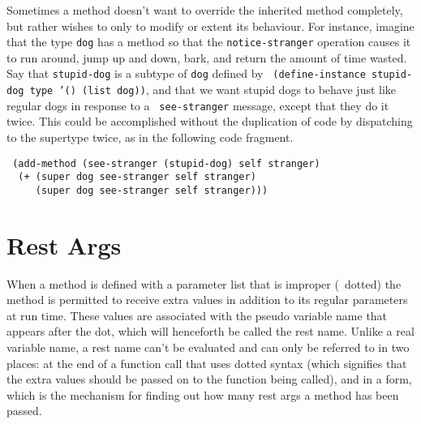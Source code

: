 Sometimes a method doesn't want to override the inherited method
completely, but rather wishes to only to modify or extent its
behaviour.  For instance, imagine that the type {\tt dog} has a method
so that the {\tt notice-stranger} operation causes it to run around,
jump up and down, bark, and return the amount of time wasted.  Say
that {\tt stupid-dog} is a subtype of {\tt dog} defined by {\tt
(define-instance stupid-dog type '() (list dog))}, and that we want
stupid dogs to behave just like regular dogs in response to a {\tt
see-stranger} message, except that they do it twice.  This could be
accomplished without the duplication of code by dispatching to the
supertype twice, as in the following code fragment.
\begin{flushleft}\tt
(add-method (see-stranger (stupid-dog) self stranger)\\
~~(+ ({\upar}super dog see-stranger self stranger)\\
~~~~~({\upar}super dog see-stranger self stranger)))
\end{flushleft}





\section{Rest Args}

When a method is defined with a parameter list that is improper (\ie\
dotted) the method is permitted to receive extra values in addition to
its regular parameters at run time.  These values are associated with
the pseudo variable name that appears after the dot, which will
henceforth be called the rest name.  Unlike a real variable name, a
rest name can't be evaluated and can only be referred to in two
places: at the end of a function call that uses dotted syntax (which
signifies that the extra values should be passed on to the function
being called), and in a \df{rest-length} form, which is the mechanism
for finding out how many rest args a method has been passed.

